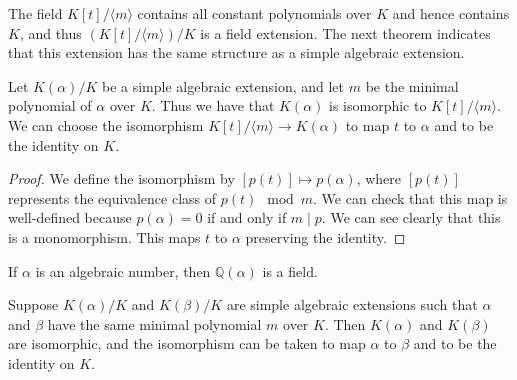 The field $K[t] / \langle m \rangle$ contains all constant polynomials over $K$ and hence contains $K$, and thus $\left(K[t] / \langle m \rangle \right) / K$ is a field extension. The next theorem indicates that this extension has the same structure as a simple algebraic extension.

\begin{theorem}
 Let $K(\alpha) / K$ be a simple algebraic extension, and let \(m\) be the minimal polynomial of \(\alpha\) over \(K\). Thus we have that $K(\alpha)$ is isomorphic to $K[t] /\langle m\rangle$. We can choose the isomorphism $K[t] /\langle m\rangle \rightarrow K(\alpha)$ to map $t$ to $\alpha$ and to be the identity on $K$.
\end{theorem}

\begin{proof}
We define the isomorphism by $[p(t)] \mapsto p(\alpha)$, where $[p(t)]$ represents the equivalence class of $p(t)\mod m$. We can check that this map is well-defined because $p(\alpha)=0$ if and only if $m \mid p$. We can see clearly that this is a monomorphism. This maps \(t\) to \(\alpha\) preserving the identity.
\end{proof}

\begin{corollary}
	If \(\alpha\) is an algebraic number, then \(\mathbb{Q}(\alpha)\) is a field.
\end{corollary}

\begin{corollary} \label{thm:minimal-polynomial-roots-isomorphic}
    Suppose $K(\alpha) / K$ and $K(\beta) / K$ are simple algebraic extensions such that $\alpha$ and $\beta$ have the same minimal polynomial $m$ over $K$. Then $K(\alpha)$ and $K(\beta)$ are isomorphic, and the isomorphism can be taken to map $\alpha$ to $\beta$ and to be the identity on $K$.
\end{corollary}


